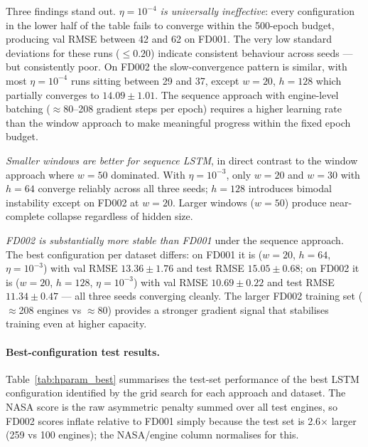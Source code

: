 \documentclass[a4paper,11pt]{article}
\begin{document}
Three findings stand out.
\textit{$\eta=10^{-4}$ is universally ineffective}: every configuration in the lower half of the table fails to converge within the 500-epoch budget, producing val RMSE between 42 and 62 on FD001.
The very low standard deviations for these runs ($\leq 0.20$) indicate consistent behaviour across seeds — but consistently poor.
On FD002 the slow-convergence pattern is similar, with most $\eta=10^{-4}$ runs sitting between 29 and 37, except $w=20$, $h=128$ which partially converges to $14.09 \pm 1.01$.
The sequence approach with engine-level batching ($\approx$80--208 gradient steps per epoch) requires a higher learning rate than the window approach to make meaningful progress within the fixed epoch budget.

\textit{Smaller windows are better for sequence LSTM}, in direct contrast to the window approach where $w=50$ dominated.
With $\eta=10^{-3}$, only $w=20$ and $w=30$ with $h=64$ converge reliably across all three seeds; $h=128$ introduces bimodal instability except on FD002 at $w=20$.
Larger windows ($w=50$) produce near-complete collapse regardless of hidden size.

\textit{FD002 is substantially more stable than FD001} under the sequence approach.
The best configuration per dataset differs: on FD001 it is ($w=20$, $h=64$, $\eta=10^{-3}$) with val RMSE $13.36 \pm 1.76$ and test RMSE $15.05 \pm 0.68$; on FD002 it is ($w=20$, $h=128$, $\eta=10^{-3}$) with val RMSE $10.69 \pm 0.22$ and test RMSE $11.34 \pm 0.47$ — all three seeds converging cleanly.
The larger FD002 training set ($\approx$208 engines vs $\approx$80) provides a stronger gradient signal that stabilises training even at higher capacity.

\paragraph{Best-configuration test results.}
Table~\ref{tab:hparam_best} summarises the test-set performance of the best LSTM configuration identified by the grid search for each approach and dataset.
The NASA score is the raw asymmetric penalty summed over all test engines, so FD002 scores inflate relative to FD001 simply because the test set is 2.6$\times$ larger (259 vs 100 engines); the NASA/engine column normalises for this.
\end{document}
